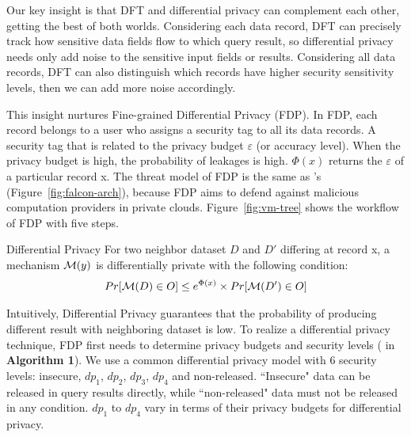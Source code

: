 Our key insight is that DFT and differential privacy can complement each other, 
getting the best of both worlds. Considering each data record, DFT can 
precisely track how sensitive data fields flow to which query result, so 
differential privacy needs only add noise to the sensitive input fields or 
results. Considering all data records, DFT can also distinguish which records 
have higher security sensitivity levels, then we can add more noise accordingly.

This insight nurtures Fine-grained Differential Privacy (FDP). In FDP, each 
record belongs to a user who assigns a security tag to all its data records.
A security tag that is related to the privacy budget $\varepsilon$ (or accuracy 
level). When the privacy budget is high, the probability of leakages is high.
$\Phi(x)$ returns the $\varepsilon$ of a particular 
record x. The threat model of FDP is the same as \kakute's 
(Figure~\ref{fig:falcon-arch}), because FDP aims to defend against malicious 
computation providers in private clouds. Figure~\ref{fig:vm-tree} shows the 
workflow of FDP with five steps.

\begin{definition}{Differential Privacy}
For two neighbor dataset $D$ and $D'$ differing at record x,
a mechanism ${\cal M}(y)$ is differentially private with the following 
condition:
\begin{align}
Pr[{\cal M}(D) \in O] \leq e^{\Phi(x)} \times Pr[{\cal M}(D') \in O]
\end{align}
\end{definition}



Intuitively, Differential Privacy guarantees that the probability of
producing different result with neighboring dataset is low. To realize a 
differential privacy technique, FDP first needs to determine privacy budgets 
and security levels ( in \textbf{Algorithm 1}). We use a common 
differential privacy model with 6 security levels: insecure, $dp_1$, $dp_2$, 
$dp_3$, $dp_4$ and non-released. ``Insecure" data can be released in query 
results directly, while ``non-released" data must not be released in any 
condition. $dp_1$ to $dp_4$ vary in terms of their privacy budgets for 
differential privacy.



